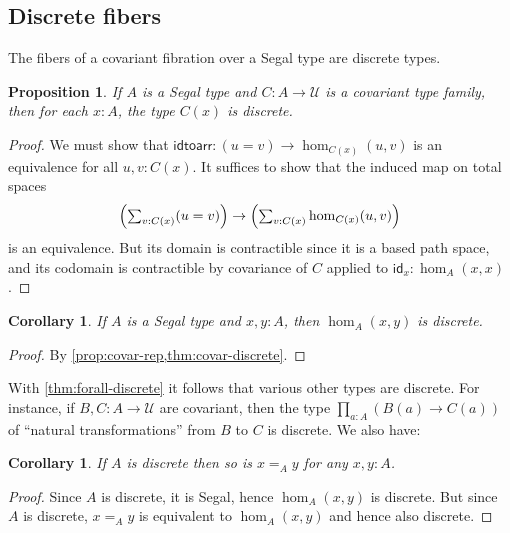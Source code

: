 \documentclass{amsart}
\theoremstyle{plain}
\newtheorem{cor}[thm]{Corollary}
\newtheorem{prop}[thm]{Proposition}
\theoremstyle{definition}
\theoremstyle{remark}
\numberwithin{equation}{section}
\newcommand{\tsum}{\textstyle\sum}
\newcommand{\univtype}{\mathcal{U}}
\newcommand{\idtoarr}{\mathsf{idtoarr}}
\newcommand{\idarr}[1]{\mathsf{id}_{#1}}
\newcommand{\covtr}[1]{{#1}_*}  %
\newcommand{\istrans}[2]{\mathsf{trans}_{#1,#2}}
\newcommand{\Parens}[1]{\Bigl(#1\Bigr)}
\begin{document}



\subsection{Discrete fibers}

The fibers of a covariant fibration over a Segal type are discrete types.


\begin{prop}\label{thm:covar-discrete} If $A$ is a Segal type and $C \colon A \to \univtype$ is a covariant type family, then for each $x : A$, the type $C(x)$ is discrete.
\end{prop}
\begin{proof}
  We must show that $\idtoarr: (u=v) \to \hom_{C(x)}(u,v)$ is an equivalence for all $u,v:C(x)$.
  It suffices to show that the induced map on total spaces
  \[ \Parens{\tsum_{v:C(x)} (u=v)} \to \Parens{\sum_{v:C(x)} \hom_{C(x)}(u,v)} \]
  is an equivalence.
  But its domain is contractible since it is a based path space, and its codomain is contractible by covariance of $C$ applied to $\idarr x : \hom_A(x,x)$.
\end{proof}

\begin{cor}\label{thm:segal-hom-discrete}
  If $A$ is a Segal type and $x,y:A$, then $\hom_A(x,y)$ is discrete.
\end{cor}
\begin{proof}
  By \cref{prop:covar-rep,thm:covar-discrete}.
\end{proof}

With \cref{thm:forall-discrete} it follows that various other types are discrete.
For instance, if $B,C:A\to \univtype$ are covariant, then the type $\prod_{a:A} (B(a) \to C(a))$ of ``natural transformations'' from $B$ to $C$ is discrete.
We also have:

\begin{cor}\label{thm:discrete-eq-discrete}
  If $A$ is discrete then so is $x=_A y$ for any $x,y:A$.
\end{cor}
\begin{proof}
  Since $A$ is discrete, it is Segal, hence $\hom_A(x,y)$ is discrete.
  But since $A$ is discrete, $x=_A y$ is equivalent to $\hom_A(x,y)$ and hence also discrete.
\end{proof}
\end{document}
